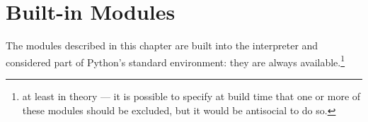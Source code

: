 \chapter{Built-in Modules}

The modules described in this chapter are built into the interpreter
and considered part of Python's standard environment: they are always
available.\footnote{at least in theory --- it is possible to specify
at build time that one or more of these modules should be excluded,
but it would be antisocial to do so.}

